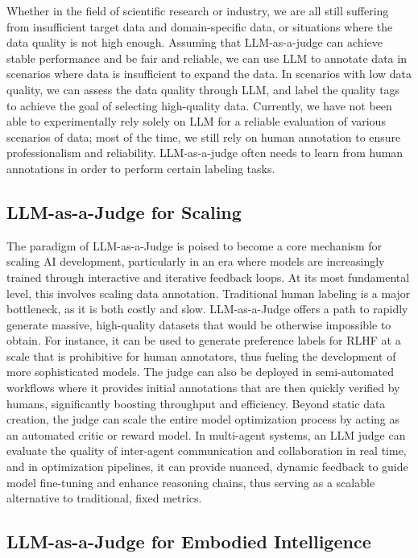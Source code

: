Whether in the field of scientific research or industry, we are all still suffering from insufficient target data and domain-specific data, or situations where the data quality is not high enough. Assuming that LLM-as-a-judge can achieve stable performance and be fair and reliable, we can use LLM to annotate data in scenarios where data is insufficient to expand the data. In scenarios with low data quality, we can assess the data quality through LLM, and label the quality tags to achieve the goal of selecting high-quality data. Currently, we have not been able to experimentally rely solely on LLM for a reliable evaluation of various scenarios of data; most of the time, we still rely on human annotation to ensure professionalism and reliability. LLM-as-a-judge often needs to learn from human annotations in order to perform certain labeling tasks.




\subsection{LLM-as-a-Judge for Scaling}\label{subsec:llm_judge_scaling}

The paradigm of LLM-as-a-Judge is poised to become a core mechanism for scaling AI development, particularly in an era where models are increasingly trained through interactive and iterative feedback loops. At its most fundamental level, this involves scaling data annotation. Traditional human labeling is a major bottleneck, as it is both costly and slow. LLM-as-a-Judge offers a path to rapidly generate massive, high-quality datasets that would be otherwise impossible to obtain. For instance, it can be used to generate preference labels for RLHF at a scale that is prohibitive for human annotators, thus fueling the development of more sophisticated models. The judge can also be deployed in semi-automated workflows where it provides initial annotations that are then quickly verified by humans, significantly boosting throughput and efficiency. Beyond static data creation, the judge can scale the entire model optimization process by acting as an automated critic or reward model. In multi-agent systems, an LLM judge can evaluate the quality of inter-agent communication and collaboration in real time, and in optimization pipelines, it can provide nuanced, dynamic feedback to guide model fine-tuning and enhance reasoning chains, thus serving as a scalable alternative to traditional, fixed metrics.

\subsection{LLM-as-a-Judge for Embodied Intelligence}\label{subsec:llm_judge_embodied}

